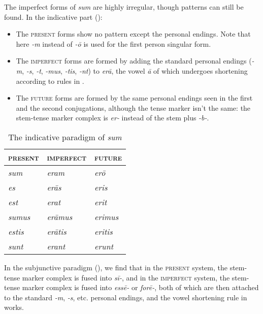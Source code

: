 \documentclass[a4paper, oneside]{report}
\newcommand{\form}[1]{\emph{#1}}
\newcommand*{\category}[1]{\textsc{#1}}
\begin{document}
The imperfect forms of \form{sum} are highly irregular,
though patterns can still be found.
In the indicative part (): 
\begin{itemize}
    \item The \category{present} forms show no pattern
    except the personal endings.
    Note that here \form{-m} instead of \form{-\={o}}
    is used for the first person singular form.
    \item The \category{imperfect} forms are formed 
    by adding the standard personal endings 
    (\form{-m}, \form{-s}, \form{-t}, 
    \form{-mus}, \form{-tis}, \form{-nt})
    to \form{er\={a}},
    the vowel \form{\={a}} of which 
    undergoes shortening according to rules in .
    \item The \category{future} forms are formed by 
    the same personal endings seen in the first and the second conjugations,
    although the tense marker isn't the same: 
    the stem-tense marker complex is \form{er-}
    instead of the stem plus \form{-b-}.
\end{itemize}

\begin{table}[H]
    \caption{The indicative paradigm of \form{sum}}
    \label{tbl:indicative-sum}
    \centering
    \begin{tabular}{lll}
    \toprule
    \category{present} & \category{imperfect}  & \category{future}  \\
    \midrule
    \form{sum}     & \form{eram}       & \form{er\={o}} \\
    \form{es}      & \form{er\={a}s}   & \form{eris}    \\
    \form{est}     & \form{erat}       & \form{erit}    \\
    \form{sumus}   & \form{er\={a}mus} & \form{erimus}  \\
    \form{estis}   & \form{er\={a}tis} & \form{eritis}  \\
    \form{sunt}    & \form{erant}      & \form{erunt}   \\ \bottomrule
    \end{tabular}
\end{table}

In the subjunctive paradigm (),
we find that in the \category{present} system, 
the stem-tense marker complex is fused into \form{sī-},
and in the \category{imperfect} system,
the stem-tense marker complex is fused into \form{ess\={e}-} or \form{for\={e}-},
both of which are then attached to the standard \form{-m}, \form{-s}, etc. 
personal endings, 
and the vowel shortening rule in  works.
\end{document}
